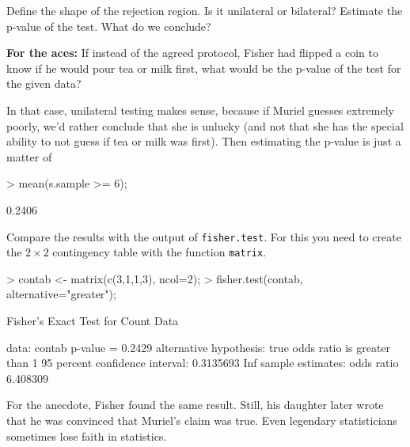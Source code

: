 \documentclass[a4paper]{article}
\theoremstyle{definition}
\begin{document}
\begin{Exercise}
Define the shape of the rejection region. Is it unilateral or bilateral?
Estimate the p-value of the test. What do we conclude?
\par\noindent\textcolor{BrickRed}{\textbf{For the aces:} If instead of
the agreed protocol, Fisher had flipped a coin to know if he would pour
tea or milk first, what would be the p-value of the test for the given
data?}
\end{Exercise}
\begin{Answer}
In that case, unilateral testing makes sense, because if Muriel guesses
extremely poorly, we'd rather conclude that she is unlucky (and not that
she has the special ability to not guess if tea or milk was first).
Then estimating the p-value is just a matter of
\begin{Schunk}
\begin{Sinput}
> mean(s.sample >= 6);
\end{Sinput}
\begin{Soutput}
[1] 0.2406
\end{Soutput}
\end{Schunk}
\end{Answer}

\begin{Exercise}
Compare the results with the output of \texttt{fisher.test}. For this
you need to create the $2\times 2$ contingency table with the function
\texttt{matrix}.
\end{Exercise}
\begin{Answer}
\begin{Schunk}
\begin{Sinput}
> contab <- matrix(c(3,1,1,3), ncol=2);
> fisher.test(contab, alternative="greater");
\end{Sinput}
\begin{Soutput}
	Fisher's Exact Test for Count Data

data:  contab 
p-value = 0.2429
alternative hypothesis: true odds ratio is greater than 1 
95 percent confidence interval:
 0.3135693       Inf 
sample estimates:
odds ratio 
  6.408309 
\end{Soutput}
\end{Schunk}
\par
For the anecdote, Fisher found the same result. Still, his daughter
later wrote that he was convinced that Muriel's claim was true.
Even legendary statisticians sometimes lose faith in statistics.
\end{Answer}

\cleardoublepage
\shipoutAnswer
\end{document}
